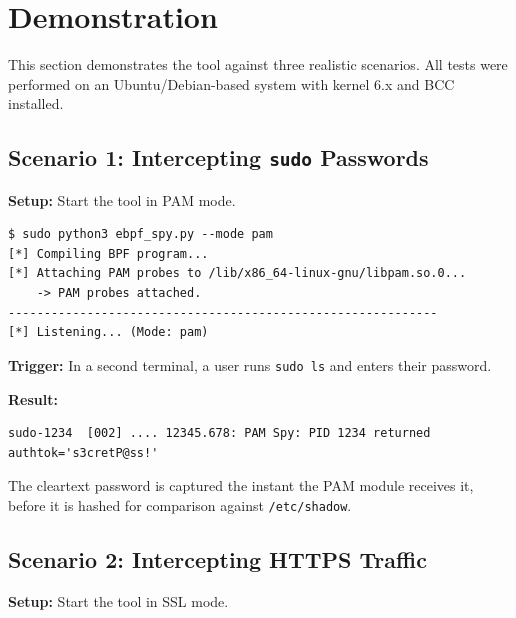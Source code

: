 \documentclass[11pt,a4paper]{article}
\begin{document}
\section{Demonstration}
\label{sec:demonstration}

This section demonstrates the tool against three realistic scenarios. All tests
were performed on an Ubuntu/Debian-based system with kernel 6.x and BCC
installed.

\subsection{Scenario 1: Intercepting \texttt{sudo} Passwords}
\label{subsec:demo_pam}

\textbf{Setup:} Start the tool in PAM mode.

\begin{lstlisting}[style=shellstyle]
$ sudo python3 ebpf_spy.py --mode pam
[*] Compiling BPF program...
[*] Attaching PAM probes to /lib/x86_64-linux-gnu/libpam.so.0...
    -> PAM probes attached.
------------------------------------------------------------
[*] Listening... (Mode: pam)
\end{lstlisting}

\textbf{Trigger:} In a second terminal, a user runs \texttt{sudo ls} and enters
their password.

\textbf{Result:}
\begin{lstlisting}[style=shellstyle]
sudo-1234  [002] .... 12345.678: PAM Spy: PID 1234 returned authtok='s3cretP@ss!'
\end{lstlisting}

The cleartext password is captured the instant the PAM module receives it,
before it is hashed for comparison against \texttt{/etc/shadow}.

\subsection{Scenario 2: Intercepting HTTPS Traffic}
\label{subsec:demo_ssl}

\textbf{Setup:} Start the tool in SSL mode.
\end{document}
